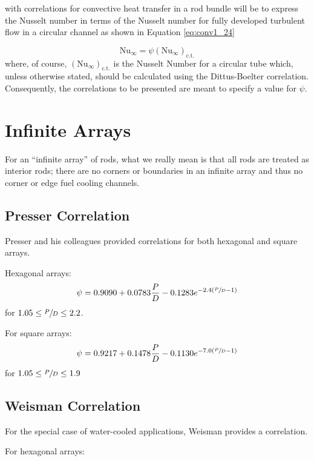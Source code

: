  with correlations for convective heat transfer in a rod bundle will be to express the Nusselt number in terms of the Nusselt number for fully developed turbulent flow in a circular channel as shown in Equation \ref{eq:conv1_24}

\begin{equation}
\text{Nu}_{\infty} = \psi \left(\text{Nu}_{\infty} \right)_{\text{c.t.}}
\label{eq:conv1_24}
\end{equation}
where, of course, $(\text{Nu}_{\infty})_{\text{c.t.}}$ is the Nusselt Number for a circular tube which, unless otherwise stated, should be calculated using the Dittus-Boelter correlation.  Consequently, the correlations to be presented are meant to specify a value for $\psi$.

\section{Infinite Arrays}
For an ``infinite array'' of rods, what we really mean is that all rods are treated as interior rods; there are no corners or boundaries in an infinite array and thus no corner or edge fuel cooling channels.

\subsection{Presser Correlation}
Presser and his colleagues provided correlations for both hexagonal and square arrays.

Hexagonal arrays:
\begin{equation}
\psi = 0.9090 + 0.0783 \frac{P}{D} - 0.1283 e^{-2.4(\sfrac{P}{D}-1)}
\label{eq:presser-hex}
\end{equation}
for $1.05 \le \sfrac{P}{D} \le 2.2$.

For square arrays:
\begin{equation}
\psi = 0.9217 + 0.1478 \frac{P}{D} - 0.1130 e^{-7.0(\sfrac{P}{D} - 1)}
\label{eq:presser-square}
\end{equation} 
for $1.05 \le \sfrac{P}{D} \le 1.9$

\subsection{Weisman Correlation} 
For the special case of water-cooled applications, Weisman provides a correlation.\cite{weisman1959heat}

For hexagonal arrays:

